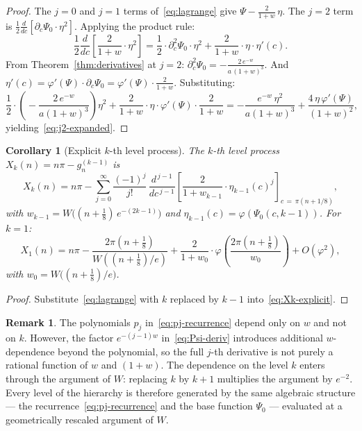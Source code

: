 \documentclass[11pt]{article}
\newtheorem{corollary}[theorem]{Corollary}
\theoremstyle{definition}
\newtheorem{remark}[theorem]{Remark}
\begin{document}
\begin{proof}
The $j=0$ and $j=1$ terms of~\eqref{eq:lagrange} give
$\Psi - \frac{2}{1+w}\,\eta$. The $j=2$ term is
$\frac{1}{2}\frac{d}{dc}[\partial_c\Psi_0\cdot\eta^2]$.
Applying the product rule:
\begin{equation}
  \frac{1}{2}\frac{d}{dc}\!\left[\frac{2}{1+w}\cdot\eta^2\right]
  = \frac{1}{2}\cdot\partial_c^2\Psi_0\cdot\eta^2
    + \frac{2}{1+w}\cdot\eta\cdot\eta'(c).
\end{equation}
From Theorem~\ref{thm:derivatives} at $j=2$:
$\partial_c^2\Psi_0 = -\frac{2\,e^{-w}}{a\,(1+w)^3}$.
And $\eta'(c) = \varphi'(\Psi)\cdot\partial_c\Psi_0
= \varphi'(\Psi)\cdot\frac{2}{1+w}$. Substituting:
\begin{equation*}
  \frac{1}{2}\cdot\!\left(\!-\frac{2\,e^{-w}}{a(1+w)^3}\right)\eta^2
  + \frac{2}{1+w}\cdot\eta\cdot\varphi'(\Psi)\cdot\frac{2}{1+w}
  = -\frac{e^{-w}\,\eta^2}{a(1+w)^3} + \frac{4\,\eta\,\varphi'(\Psi)}{(1+w)^2},
\end{equation*}
yielding~\eqref{eq:j2-expanded}.
\end{proof}

\begin{corollary}[Explicit $k$-th level process]
The $k$-th level process $X_k(n) = n\pi - g_n^{(k-1)}$ is
\begin{equation}
  X_k(n) = n\pi
    - \sum_{j=0}^{\infty} \frac{(-1)^j}{j!}\,
      \frac{d^{\,j-1}}{dc^{\,j-1}}\!\left[
        \frac{2}{1+w_{k-1}}
        \cdot \eta_{k-1}(c)^j
      \right]_{c\,=\,\pi(n+1/8)},
  \label{eq:Xk-full}
\end{equation}
with $w_{k-1} = W\!\bigl((n+\tfrac{1}{8})\,e^{-(2k-1)}\bigr)$
and $\eta_{k-1}(c) = \varphi(\Psi_0(c,k-1))$.
For $k=1$:
\begin{equation}
  X_1(n) = n\pi
    - \frac{2\pi\!\left(n+\tfrac{1}{8}\right)}{W\!\left((n+\tfrac{1}{8})/e\right)}
    + \frac{2}{1+w_0}\cdot\varphi\!\left(
        \frac{2\pi(n+\tfrac{1}{8})}{w_0}\right)
    + O\!\left(\varphi^2\right),
  \label{eq:X1-explicit}
\end{equation}
with $w_0 = W\!\bigl((n+\tfrac{1}{8})/e\bigr)$.
\end{corollary}

\begin{proof}
Substitute~\eqref{eq:lagrange} with $k$ replaced by $k-1$
into~\eqref{eq:Xk-explicit}.
\end{proof}

\begin{remark}
The polynomials $p_j$ in~\eqref{eq:pj-recurrence} depend only on $w$
and not on $k$. However, the factor $e^{-(j-1)w}$
in~\eqref{eq:Psi-deriv} introduces additional $w$-dependence beyond
the polynomial, so the full $j$-th derivative is not purely a rational
function of $w$ and $(1+w)$. The dependence on the level $k$ enters
through the argument of $W$: replacing $k$ by $k+1$ multiplies the
argument by $e^{-2}$. Every level of the hierarchy is therefore
generated by the same algebraic structure --- the
recurrence~\eqref{eq:pj-recurrence} and the base function
$\Psi_0$ --- evaluated at a geometrically rescaled argument of $W$.
\end{remark}
\end{document}
